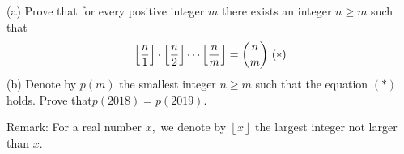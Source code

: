 (a) Prove that for every positive integer $m$ there exists an integer $n\ge m$ such that$$\left \lfloor \frac{n}{1} \right \rfloor \cdot \left \lfloor \frac{n}{2} \right \rfloor \cdots \left \lfloor \frac{n}{m} \right \rfloor =\binom{n}{m} \\\\\\\\\\\\\\\        (*)$$(b) Denote by $p(m)$ the smallest integer $n \geq m$ such that the equation  $ (*)$ holds. Prove that$p(2018) = p(2019).$

Remark: For a real number $x,$  we denote by $\left \lfloor x \right \rfloor$  the largest integer not larger than $x.$